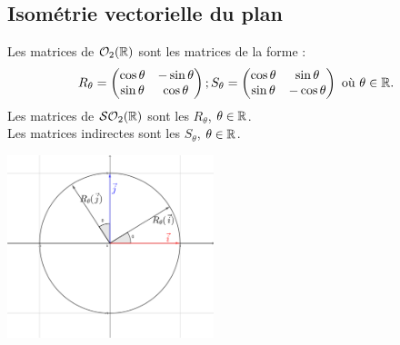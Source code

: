 \documentclass{book}
\begin{document}
\subsection{Isométrie vectorielle du plan}
\begin{Proposition}[Classification]
Les matrices de $\mathcal{O}_2(\mathbb{R})$ sont les matrices de la forme :
$$ R_\theta = \begin{pmatrix} \cos \theta &-\sin \theta \\ \sin \theta & \cos \theta \end{pmatrix}; S_{\theta}=\begin{pmatrix} \cos \theta &\sin \theta \\ \sin \theta & -\cos \theta \end{pmatrix} \text{ où } \theta \in \mathbb{R}.$$
Les matrices de $\mathcal{SO}_2(\mathbb{R})$ sont les $R_\theta$, $\theta \in \mathbb{R}$.\\
Les matrices indirectes sont les $S_\theta$, $\theta \in \mathbb{R}$.
\begin{center}
\includegraphics[width=6cm]{rotation.png}
\end{center}
\end{Proposition}
\end{document}
